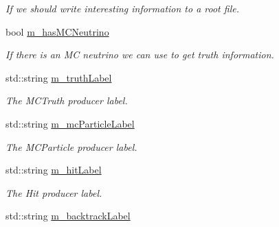 \begin{DoxyCompactItemize}
\begin{DoxyCompactList}\small\item\em If we should write interesting information to a root file. \end{DoxyCompactList}\item 
bool \hyperlink{classflashmatch_1_1FlashMatchingTool_a6a48a0c7ba51c6383080aec264c41ea0}{m\+\_\+has\+M\+C\+Neutrino}\hypertarget{classflashmatch_1_1FlashMatchingTool_a6a48a0c7ba51c6383080aec264c41ea0}{}\label{classflashmatch_1_1FlashMatchingTool_a6a48a0c7ba51c6383080aec264c41ea0}

\begin{DoxyCompactList}\small\item\em If there is an MC neutrino we can use to get truth information. \end{DoxyCompactList}\item 
std\+::string \hyperlink{classflashmatch_1_1FlashMatchingTool_a7ecd3035c9f9871021e0eed80db108e7}{m\+\_\+truth\+Label}\hypertarget{classflashmatch_1_1FlashMatchingTool_a7ecd3035c9f9871021e0eed80db108e7}{}\label{classflashmatch_1_1FlashMatchingTool_a7ecd3035c9f9871021e0eed80db108e7}

\begin{DoxyCompactList}\small\item\em The M\+C\+Truth producer label. \end{DoxyCompactList}\item 
std\+::string \hyperlink{classflashmatch_1_1FlashMatchingTool_ab68ae36a24edb32725cc8f6b5884cc93}{m\+\_\+mc\+Particle\+Label}\hypertarget{classflashmatch_1_1FlashMatchingTool_ab68ae36a24edb32725cc8f6b5884cc93}{}\label{classflashmatch_1_1FlashMatchingTool_ab68ae36a24edb32725cc8f6b5884cc93}

\begin{DoxyCompactList}\small\item\em The M\+C\+Particle producer label. \end{DoxyCompactList}\item 
std\+::string \hyperlink{classflashmatch_1_1FlashMatchingTool_a8dff6789389dc7519c006616d1dc80ea}{m\+\_\+hit\+Label}\hypertarget{classflashmatch_1_1FlashMatchingTool_a8dff6789389dc7519c006616d1dc80ea}{}\label{classflashmatch_1_1FlashMatchingTool_a8dff6789389dc7519c006616d1dc80ea}

\begin{DoxyCompactList}\small\item\em The Hit producer label. \end{DoxyCompactList}\item 
std\+::string \hyperlink{classflashmatch_1_1FlashMatchingTool_aab819e6949faa62cc05cc990f062db9b}{m\+\_\+backtrack\+Label}\hypertarget{classflashmatch_1_1FlashMatchingTool_aab819e6949faa62cc05cc990f062db9b}{}\label{classflashmatch_1_1FlashMatchingTool_aab819e6949faa62cc05cc990f062db9b}


\end{DoxyCompactItemize}
